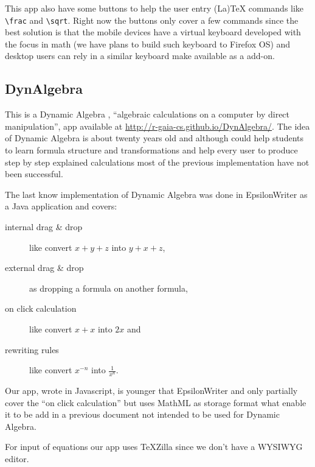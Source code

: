 This app also have some buttons to help the user entry (La)TeX commands like
{\tt \textbackslash frac} and {\tt \textbackslash sqrt}. Right now the buttons
only cover a few commands since the best solution is that the mobile devices
have a virtual keyboard developed with the focus in math (we have plans to build
such keyboard to Firefox OS) and desktop users can rely in a similar keyboard
make available as a add-on.

\subsection{DynAlgebra}

This is a Dynamic Algebra \cite{Nicaud1}, ``algebraic calculations
on a computer by direct manipulation'', app available at
\href{http://r-gaia-cs.github.io/DynAlgebra/}{http://r-gaia-cs.github.io/DynAlgebra/}.
The idea of Dynamic Algebra is about twenty years old and although could help
students to learn formula structure and transformations and help every user to
produce step by step explained calculations most of the previous implementation
have not been successful.

The last know implementation of Dynamic Algebra was done in EpsilonWriter
\cite{Nicaud2} as a Java application and covers:
\begin{description}
  \item[internal drag \& drop] like convert $x + y + z$ into $y + x + z$,
  \item[external drag \& drop] as dropping a formula on another formula,
  \item[on click calculation] like convert $x + x$ into $2 x$ and
  \item[rewriting rules] like convert $x^{-n}$ into $\frac{1}{x^n}$.
\end{description}
Our app, wrote in Javascript, is younger that EpsilonWriter and only partially
cover the ``on click calculation'' but uses MathML as storage format what enable
it to be add in a previous document not intended to be used for Dynamic Algebra.

For input of equations our app uses TeXZilla since we don't have a WYSIWYG
editor.
